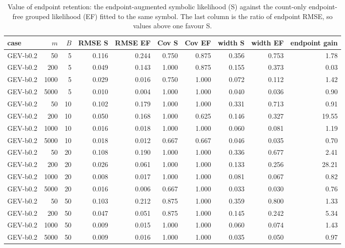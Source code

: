 \begin{table}[t]
\centering
\small
\caption{Value of endpoint retention: the endpoint-augmented symbolic likelihood (S) against the count-only endpoint-free grouped likelihood (EF) fitted to the same symbol. The last column is the ratio of endpoint RMSE, so values above one favour S.}
\label{tab:sim-countonly}
\begin{tabular}{lrrrrrrrrr}
\toprule
case & $m$ & $B$ & RMSE S & RMSE EF & Cov S & Cov EF & width S & width EF & endpoint gain \\
\midrule
GEV-b0.2 &   50 &    5 & 0.116 & 0.244 & 0.750 & 0.875 & 0.356 & 0.753 & 1.78 \\
GEV-b0.2 &  200 &    5 & 0.049 & 0.143 & 1.000 & 0.875 & 0.155 & 0.373 & 0.03 \\
GEV-b0.2 & 1000 &    5 & 0.029 & 0.016 & 0.750 & 1.000 & 0.072 & 0.112 & 1.42 \\
GEV-b0.2 & 5000 &    5 & 0.010 & 0.004 & 1.000 & 1.000 & 0.040 & 0.036 & 0.90 \\
GEV-b0.2 &   50 &   10 & 0.102 & 0.179 & 1.000 & 1.000 & 0.331 & 0.713 & 0.91 \\
GEV-b0.2 &  200 &   10 & 0.050 & 0.168 & 1.000 & 0.625 & 0.146 & 0.327 & 19.55 \\
GEV-b0.2 & 1000 &   10 & 0.016 & 0.018 & 1.000 & 1.000 & 0.060 & 0.081 & 1.19 \\
GEV-b0.2 & 5000 &   10 & 0.018 & 0.012 & 0.667 & 0.667 & 0.046 & 0.035 & 0.70 \\
GEV-b0.2 &   50 &   20 & 0.108 & 0.190 & 1.000 & 1.000 & 0.336 & 0.677 & 2.41 \\
GEV-b0.2 &  200 &   20 & 0.026 & 0.061 & 1.000 & 1.000 & 0.133 & 0.256 & 28.21 \\
GEV-b0.2 & 1000 &   20 & 0.008 & 0.017 & 1.000 & 1.000 & 0.081 & 0.067 & 0.82 \\
GEV-b0.2 & 5000 &   20 & 0.016 & 0.006 & 0.667 & 1.000 & 0.033 & 0.030 & 0.76 \\
GEV-b0.2 &   50 &   50 & 0.103 & 0.212 & 0.875 & 1.000 & 0.359 & 0.800 & 1.33 \\
GEV-b0.2 &  200 &   50 & 0.047 & 0.051 & 0.875 & 1.000 & 0.145 & 0.242 & 5.34 \\
GEV-b0.2 & 1000 &   50 & 0.009 & 0.015 & 1.000 & 1.000 & 0.060 & 0.074 & 1.43 \\
GEV-b0.2 & 5000 &   50 & 0.009 & 0.016 & 1.000 & 1.000 & 0.035 & 0.050 & 0.97 \\
\bottomrule
\end{tabular}
\end{table}
